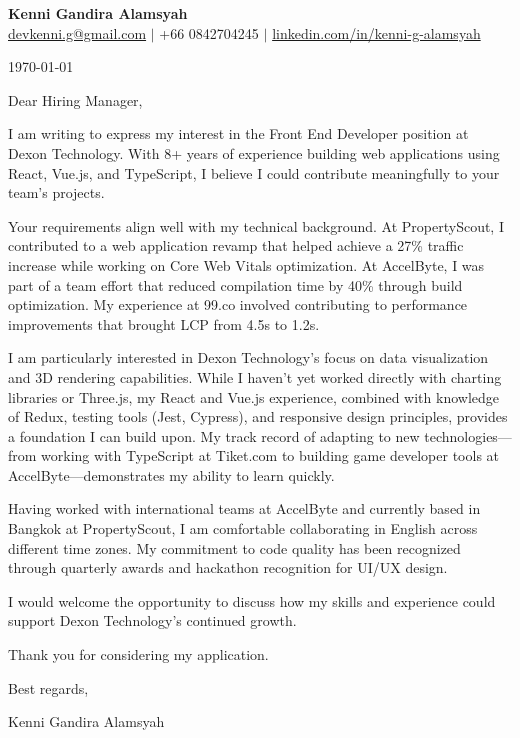 \documentclass[11pt]{article}
\begin{document}
\begin{center}
  \textbf{\Large Kenni Gandira Alamsyah}\\
  \vspace{0.5em}
  \href{mailto:devkenni.g@gmail.com}{devkenni.g@gmail.com} $|$ +66 0842704245 $|$ \href{https://www.linkedin.com/in/kenni-g-alamsyah/}{linkedin.com/in/kenni-g-alamsyah}
\end{center}

\vspace{1em}

\today

\vspace{1em}

Dear Hiring Manager,

I am writing to express my interest in the Front End Developer position at Dexon Technology. With 8+ years of experience building web applications using React, Vue.js, and TypeScript, I believe I could contribute meaningfully to your team's projects.

Your requirements align well with my technical background. At PropertyScout, I contributed to a web application revamp that helped achieve a 27\% traffic increase while working on Core Web Vitals optimization. At AccelByte, I was part of a team effort that reduced compilation time by 40\% through build optimization. My experience at 99.co involved contributing to performance improvements that brought LCP from 4.5s to 1.2s.

I am particularly interested in Dexon Technology's focus on data visualization and 3D rendering capabilities. While I haven't yet worked directly with charting libraries or Three.js, my React and Vue.js experience, combined with knowledge of Redux, testing tools (Jest, Cypress), and responsive design principles, provides a foundation I can build upon. My track record of adapting to new technologies---from working with TypeScript at Tiket.com to building game developer tools at AccelByte---demonstrates my ability to learn quickly.

Having worked with international teams at AccelByte and currently based in Bangkok at PropertyScout, I am comfortable collaborating in English across different time zones. My commitment to code quality has been recognized through quarterly awards and hackathon recognition for UI/UX design.

I would welcome the opportunity to discuss how my skills and experience could support Dexon Technology's continued growth.

Thank you for considering my application.

\vspace{1em}

Best regards,

\vspace{1em}

Kenni Gandira Alamsyah
\end{document}
